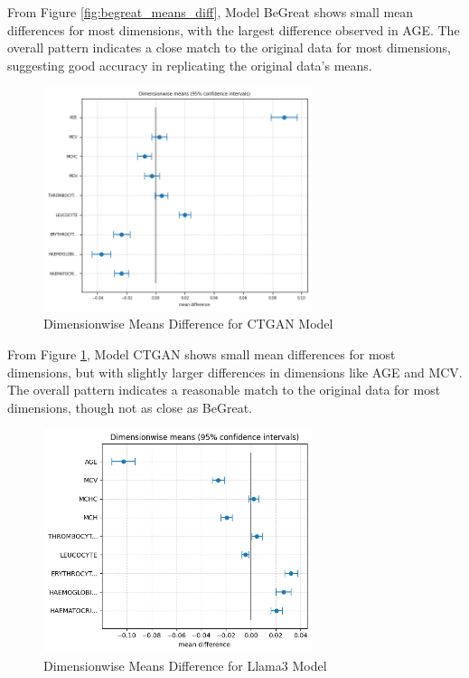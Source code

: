 From Figure \ref{fig:begreat_means_diff}, Model BeGreat shows small mean differences for most dimensions, with the largest difference observed in AGE. The overall pattern indicates a close match to the original data for most dimensions, suggesting good accuracy in replicating the original data's means.

\begin{figure}[H]
    \centering
    \includegraphics[width=0.7\textwidth]{images/ctgan_dimension.png}
    \caption{Dimensionwise Means Difference for CTGAN Model}
    \label{fig:ctgan_means_diff}
\end{figure}

From Figure \ref{fig:ctgan_means_diff}, Model CTGAN shows small mean differences for most dimensions, but with slightly larger differences in dimensions like AGE and MCV. The overall pattern indicates a reasonable match to the original data for most dimensions, though not as close as BeGreat.

\begin{figure}[H]
    \centering
    \includegraphics[width=0.7\textwidth]{images/llama_dimension.png}
    \caption{Dimensionwise Means Difference for Llama3 Model}
    \label{fig:llama3_means_diff}
\end{figure}

